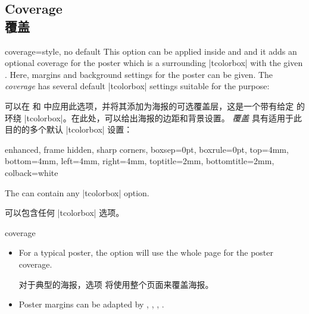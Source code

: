\subsection{Coverage\\覆盖}\label{subsec:poster_coverage}

\begin{postersetTcbKey}[][doc new=2017-07-03]{coverage}{=}{style, no default}
This option can be applied inside  and 
and it adds an optional coverage for the poster which is a surrounding |tcolorbox|
with the given . Here, margins and background settings
for the poster can be given.
The \emph{coverage} has several default |tcolorbox| settings
suitable for the purpose:

可以在  和  中应用此选项，并将其添加为海报的可选覆盖层，这是一个带有给定  的环绕 |tcolorbox|。在此处，可以给出海报的边距和背景设置。 \emph{覆盖} 具有适用于此目的的多个默认 |tcolorbox| 设置：
\begin{dispListing}
enhanced, frame hidden, sharp corners, boxsep=0pt, boxrule=0pt,
top=4mm, bottom=4mm, left=4mm, right=4mm,
toptitle=2mm, bottomtitle=2mm, colback=white
\end{dispListing}

The  can contain any |tcolorbox| option.

 可以包含任何 |tcolorbox| 选项。
\begin{exdispExample}{coverage}
\begin{tcbposter}[
  poster   = {showframe,spacing=1mm},
  coverage = {height=5cm,
              interior style={top color=yellow,bottom color=yellow!50!red},
              watermark text={My Poster},watermark color=white,
             },
]
\end{tcbposter}
\end{exdispExample}

\begin{itemize}
\item For a typical poster, the option  will use the
whole page for the poster coverage.

对于典型的海报，选项  将使用整个页面来覆盖海报。
\item Poster margins can be adapted by , ,
, .


\end{itemize}
\end{postersetTcbKey}
